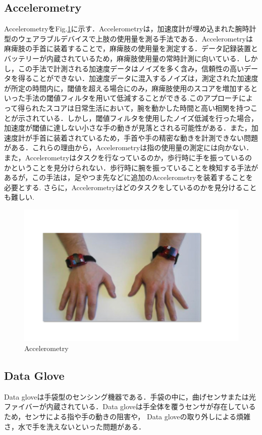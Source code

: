\subsection*{Accelerometry}
Accelerometry\cite{Chen2005,Hayward2016,Dwiputra2017,VanDerPas2011,VanDerLee2004,Thrane2011}をFig.\ref{fig:Accelerometry}に示す．Accelerometryは，加速度計が埋め込まれた腕時計型のウェアラブルデバイスで上肢の使用量を測る手法である．Accelerometryは麻痺肢の手首に装着することで，麻痺肢の使用量を測定する．データ記録装置とバッテリーが内蔵されているため，麻痺肢使用量の常時計測に向いている\cite{VanDerPas2011}．しかし，この手法で計測される加速度データはノイズを多く含み，信頼性の高いデータを得ることができない．加速度データに混入するノイズは，測定された加速度が所定の時間内に，閾値を超える場合にのみ，麻痺肢使用のスコアを増加するといった手法の閾値フィルタを用いて低減することができる.このアプローチによって得られたスコアは日常生活において，腕を動かした時間と高い相関を持つことが示されている．しかし，閾値フィルタを使用したノイズ低減を行った場合，加速度が閾値に達しない小さな手の動きが見落とされる可能性がある．また，加速度計が手首に装着されているため，手首や手の精密な動きを計測できない問題がある．これらの理由から，Accelerometryは指の使用量の測定には向かない\cite{Uswatte2000}．
また，Accelerometryはタスクを行なっているのか，歩行時に手を振っているのかということを見分けられない．歩行時に腕を振っていることを検知する手法があるが，この手法は，足やつま先などに追加のAccelerometryを装着することを必要とする\cite{Ullery2015}.
さらに，Accelerometryはどのタスクをしているのかを見分けることも難しい\cite{Hayward2016}.
\begin{figure}[H]
  \centering
  \includegraphics[width=0.8\linewidth]{fig/ch1/acc}
  \caption{Accelerometry}
  \label{fig:Accelerometry}
\end{figure}



\subsection*{Data Glove}
Data gloveは手袋型のセンシング機器である．手袋の中に，曲げセンサまたは光ファイバーが内蔵されている．Data gloveは手全体を覆うセンサが存在しているため，センサによる指や手の動きの阻害や，
Data gloveの取り外しによる煩雑さ，水で手を洗えないといった問題がある．

